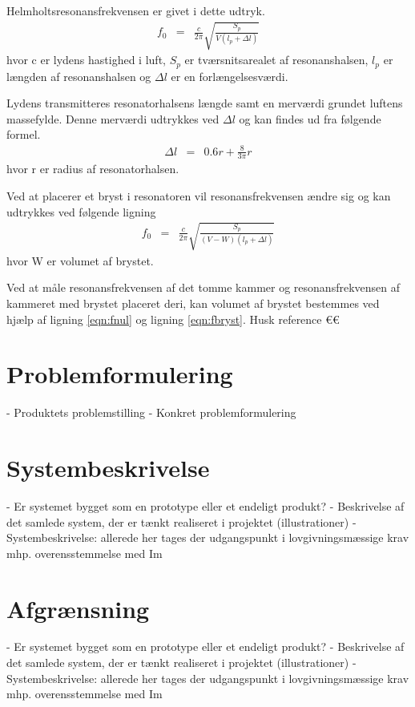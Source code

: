  
Helmholtsresonansfrekvensen er givet i dette udtryk. 
\begin{eqnarray}
\label{eqn:fnul}
f_{0}&=&\frac{c}{2\pi}\sqrt{\frac{S_{p}}{V \left(l_{p}+\Delta l\right)}}
\end{eqnarray}
hvor c er lydens hastighed i luft, $S_{p}$ er tværsnitsarealet af resonanshalsen, $l_{p}$ er længden af resonanshalsen og $\Delta l$ er en forlængelsesværdi. 

Lydens transmitteres resonatorhalsens længde samt en merværdi grundet luftens massefylde. Denne merværdi udtrykkes ved $\Delta l$ og kan findes ud fra følgende formel. 
\begin{eqnarray}
\Delta l&=&0.6r+\frac{8}{3\pi}r
\end{eqnarray}
hvor r er radius af resonatorhalsen.

Ved at placerer et bryst i resonatoren vil resonansfrekvensen ændre sig og kan udtrykkes ved følgende ligning
\begin{eqnarray}
\label{eqn:fbryst}
f_{0}&=&\frac{c}{2\pi}\sqrt{\frac{S_{p}}{(V-W)\left(l_{p}+\Delta l\right)}}
\end{eqnarray}
hvor W er volumet af brystet. 

Ved at måle resonansfrekvensen af det tomme kammer og resonansfrekvensen af kammeret med brystet placeret deri, kan volumet af brystet bestemmes ved hjælp af ligning \ref{eqn:fnul} og ligning \ref{eqn:fbryst}. Husk reference €€

\section{Problemformulering}
- Produktets problemstilling
- Konkret problemformulering

\section{Systembeskrivelse}
- Er systemet bygget som en prototype eller et endeligt produkt? 
- Beskrivelse af det samlede system, der er tænkt realiseret i projektet (illustrationer)
- Systembeskrivelse: allerede her tages der udgangspunkt i lovgivningsmæssige krav mhp. overensstemmelse med Im

\section{Afgrænsning}
- Er systemet bygget som en prototype eller et endeligt produkt? 
- Beskrivelse af det samlede system, der er tænkt realiseret i projektet (illustrationer)
- Systembeskrivelse: allerede her tages der udgangspunkt i lovgivningsmæssige krav mhp. overensstemmelse med Im

